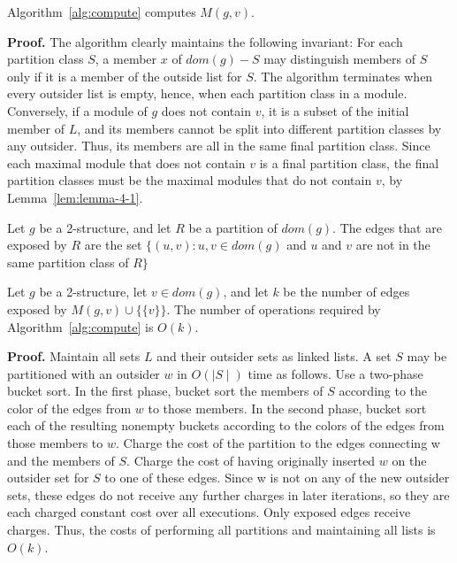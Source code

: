 \begin{mylem}
    \label{lem:4-2}
    Algorithm~\ref{alg:compute} computes $M(g, v)$.
\end{mylem}

\textbf{Proof.}
The algorithm clearly maintains the following invariant: For each partition class $S$, a member $x$ of $dom(g) - S$ may distinguish members of $S$ only if it is a member of the outside list for $S$.
The algorithm terminates when every outsider list is empty, hence, when each partition class in a module.
Conversely, if a module of $g$ does not contain $v$, it is a subset of the initial member of $L$, and its members cannot be split into different partition classes by any outsider.
Thus, its members are all in the same final partition class.
Since each maximal module that does not contain $v$ is a final partition class, the final partition classes must be the maximal modules that do not contain $v$, by Lemma~\ref{lem:lemma-4-1}.

\begin{mydef}
    \label{def:4-3}
    Let $g$ be a 2-structure, and let $R$ be a partition of $dom(g)$.
    The edges that are exposed by $R$ are the set $\{(u, v): u, v \in dom(g)$ and $u$ and $v$ are not in the same partition class of $R\}$
\end{mydef}

\begin{mylem}
    \label{lem:4-4}
    Let $g$ be a 2-structure, let $v \in dom(g)$, and let $k$ be the number of edges exposed by $M(g, v) \cup \{\{v\}\}$.
    The number of operations required by Algorithm~\ref{alg:compute} is $O(k)$.
\end{mylem}

\textbf{Proof.}
Maintain all sets $L$ and their outsider sets as linked lists.
A set $S$ may be partitioned with an outsider $w$ in $O(\mid S \mid)$ time as follows.
Use a two-phase bucket sort.
In the first phase, bucket sort the members of $S$ according to the color of the edges from $w$ to those members.
In the second phase, bucket sort each of the resulting nonempty buckets according to the colors of the edges from those members to $w$.
Charge the cost of the partition to the edges connecting w and the members of $S$.
Charge the cost of having originally inserted $w$ on the outsider set for $S$ to one of these edges.
Since w is not on any of the new outsider sets, these edges do not receive any further charges in later iterations, so they are each charged constant cost over all executions.
Only exposed edges receive charges.
Thus, the costs of performing all partitions and maintaining all lists is $O(k)$.

